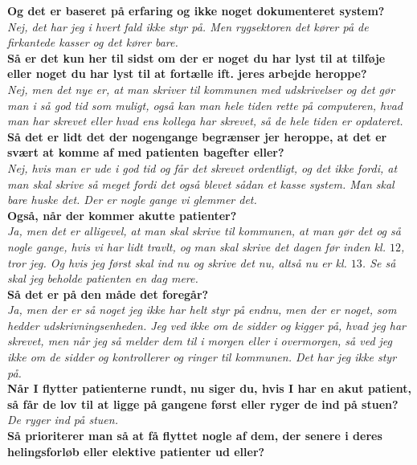 \noindent
\textbf{Og det er baseret på erfaring og ikke noget dokumenteret system?}\\
\noindent
\textit{Nej, det har jeg i hvert fald ikke styr på. Men rygsektoren det kører på de firkantede kasser og det kører bare.}\\
\noindent
\textbf{Så er det kun her til sidst om der er noget du har lyst til at tilføje eller noget du har lyst til at fortælle ift. jeres arbejde heroppe?}\\
\noindent
\textit{Nej, men det nye er, at man skriver til kommunen med udskrivelser og det gør man i så god tid som muligt, også kan man hele tiden rette på computeren, hvad man har skrevet eller hvad ens kollega har skrevet, så de hele tiden er opdateret.}\\
\noindent
\textbf{Så det er lidt det der nogengange begrænser jer heroppe, at det er svært at komme af med patienten bagefter eller?}\\
\noindent
\textit{Nej, hvis man er ude i god tid og får det skrevet ordentligt, og det ikke fordi, at man skal skrive så meget fordi det også blevet sådan et kasse system. Man skal bare huske det. Der er nogle gange vi glemmer det.}\\
\noindent
\textbf{Også, når der kommer akutte patienter?}\\
\noindent
\textit{Ja, men det er alligevel, at man skal skrive til kommunen, at man gør det og så nogle gange, hvis vi har lidt travlt, og man skal skrive det dagen før inden kl. $12$, tror jeg. Og hvis jeg først skal ind nu og skrive det nu, altså nu er kl. $13$. Se så skal jeg beholde patienten en dag mere.}\\
\noindent
\textbf{Så det er på den måde det foregår?}\\
\noindent
\textit{Ja, men der er så noget jeg ikke har helt styr på endnu, men der er noget, som hedder udskrivningsenheden. Jeg ved ikke om de sidder og kigger på, hvad jeg har skrevet, men når jeg så melder dem til i morgen eller i overmorgen, så ved jeg ikke om de sidder og kontrollerer og ringer til kommunen. Det har jeg ikke styr på.}\\
\noindent
\textbf{Når I flytter patienterne rundt, nu siger du, hvis I har en akut patient, så får de lov til at ligge på gangene først eller ryger de ind på stuen?}\\
\noindent
\textit{De ryger ind på stuen.}\\
\noindent
\textbf{Så prioriterer man så at få flyttet nogle af dem, der senere i deres helingsforløb eller elektive patienter ud eller?}\\
